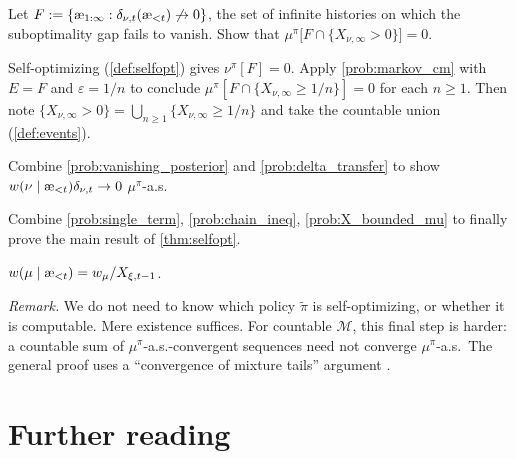 \documentclass[fontsize=11pt, parskip=half]{scrartcl}
\newcommand{\cM}{\mathcal{M}}
\newcommand{\aes}{\textnormal{\ae}}
\begin{document}
\begin{exercise}
\label{prob:delta_transfer}
Let $F := \{\aes_{1:\infty} : \delta_{\nu,t}(\aes_{<t}) \not\to 0\}$, the set of infinite histories on which the suboptimality gap fails to vanish. Show that $\mu^\pi\big[F \cap \{X_{\nu,\infty} > 0\}\big] = 0$.


\begin{hint}
Self-optimizing (\cref{def:selfopt}) gives $\nu^\pi[F] = 0$. Apply \cref{prob:markov_cm} with $E = F$ and $\varepsilon = 1/n$ to conclude $\mu^\pi[F \cap \{X_{\nu,\infty} \geq 1/n\}] = 0$ for each $n \geq 1$. Then note $\{X_{\nu,\infty} > 0\} = \bigcup_{n \geq 1} \{X_{\nu,\infty} \geq 1/n\}$ and take the countable union (\cref{def:events}).
\end{hint}
\end{exercise}


\begin{exercise}
\label{prob:single_term}
Combine \cref{prob:vanishing_posterior} and \cref{prob:delta_transfer} to show $w(\nu \mid \aes_{<t}) \delta_{\nu,t} \to 0$ $\mu^\pi$-a.s.

\end{exercise}


\begin{exercise}
\label{prob:auto6}
Combine \cref{prob:single_term}, \cref{prob:chain_ineq}, \cref{prob:X_bounded_mu} to finally prove the
 main result of \cref{thm:selfopt}.


\begin{hint}
$w(\mu \mid \aes_{<t}) = w_\mu/X_{\xi,t-1}$.
\end{hint}
\end{exercise}


\textit{Remark.} We do not need to know which policy $\tilde\pi$ is self-optimizing, or whether it is computable. Mere existence suffices.
For countable $\cM$, this final step is harder: a countable sum of $\mu^\pi$-a.s.-convergent sequences need not converge $\mu^\pi$-a.s.\ The general proof uses a ``convergence of mixture tails'' argument \cite[Lem.~5.28]{Hutter:04uaibook}.

\section*{Further reading}
\end{document}
